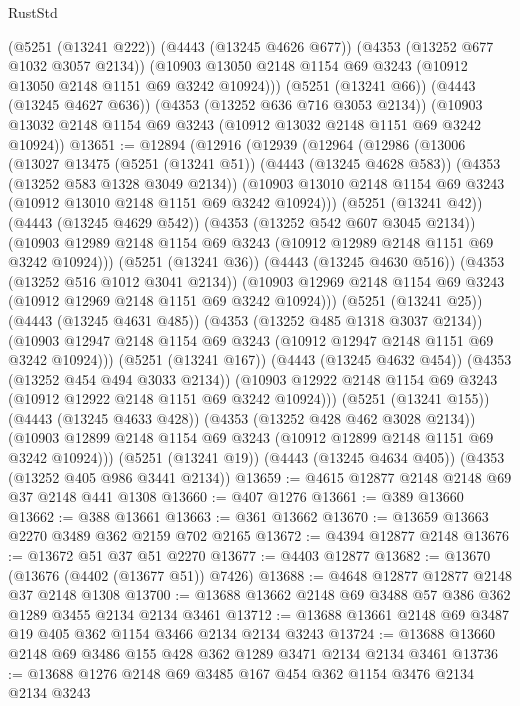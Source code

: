\begin{lexlean}{RustStd}
\begin{coremodule}
      (@5251 (@13241 @222))
      (@4443 (@13245 @4626 @677))
      (@4353 (@13252 @677 @1032 @3057 @2134))
      (@10903 @13050 @2148 @1154 @69 @3243 (@10912 @13050 @2148 @1151 @69 @3242 @10924)))
    (@5251 (@13241 @66))
    (@4443 (@13245 @4627 @636))
    (@4353 (@13252 @636 @716 @3053 @2134))
    (@10903 @13032 @2148 @1154 @69 @3243 (@10912 @13032 @2148 @1151 @69 @3242 @10924))
@13651 := @12894
    (@12916
      (@12939
        (@12964
          (@12986
            (@13006
              (@13027
                @13475
                (@5251 (@13241 @51))
                (@4443 (@13245 @4628 @583))
                (@4353 (@13252 @583 @1328 @3049 @2134))
                (@10903 @13010 @2148 @1154 @69 @3243 (@10912 @13010 @2148 @1151 @69 @3242 @10924)))
              (@5251 (@13241 @42))
              (@4443 (@13245 @4629 @542))
              (@4353 (@13252 @542 @607 @3045 @2134))
              (@10903 @12989 @2148 @1154 @69 @3243 (@10912 @12989 @2148 @1151 @69 @3242 @10924)))
            (@5251 (@13241 @36))
            (@4443 (@13245 @4630 @516))
            (@4353 (@13252 @516 @1012 @3041 @2134))
            (@10903 @12969 @2148 @1154 @69 @3243 (@10912 @12969 @2148 @1151 @69 @3242 @10924)))
          (@5251 (@13241 @25))
          (@4443 (@13245 @4631 @485))
          (@4353 (@13252 @485 @1318 @3037 @2134))
          (@10903 @12947 @2148 @1154 @69 @3243 (@10912 @12947 @2148 @1151 @69 @3242 @10924)))
        (@5251 (@13241 @167))
        (@4443 (@13245 @4632 @454))
        (@4353 (@13252 @454 @494 @3033 @2134))
        (@10903 @12922 @2148 @1154 @69 @3243 (@10912 @12922 @2148 @1151 @69 @3242 @10924)))
      (@5251 (@13241 @155))
      (@4443 (@13245 @4633 @428))
      (@4353 (@13252 @428 @462 @3028 @2134))
      (@10903 @12899 @2148 @1154 @69 @3243 (@10912 @12899 @2148 @1151 @69 @3242 @10924)))
    (@5251 (@13241 @19))
    (@4443 (@13245 @4634 @405))
    (@4353 (@13252 @405 @986 @3441 @2134))
@13659 := @4615 @12877 @2148 @2148 @69 @37 @2148 @441 @1308
@13660 := @407 @1276
@13661 := @389 @13660
@13662 := @388 @13661
@13663 := @361 @13662
@13670 := @13659 @13663 @2270 @3489 @362 @2159 @702 @2165
@13672 := @4394 @12877 @2148
@13676 := @13672 @51 @37 @51 @2270
@13677 := @4403 @12877
@13682 := @13670 (@13676 (@4402 (@13677 @51)) @7426)
@13688 := @4648 @12877 @12877 @2148 @37 @2148 @1308
@13700 := @13688 @13662 @2148 @69 @3488 @57 @386 @362 @1289 @3455 @2134 @2134 @3461
@13712 := @13688 @13661 @2148 @69 @3487 @19 @405 @362 @1154 @3466 @2134 @2134 @3243
@13724 := @13688 @13660 @2148 @69 @3486 @155 @428 @362 @1289 @3471 @2134 @2134 @3461
@13736 := @13688 @1276 @2148 @69 @3485 @167 @454 @362 @1154 @3476 @2134 @2134 @3243

\end{coremodule}
\end{lexlean}

